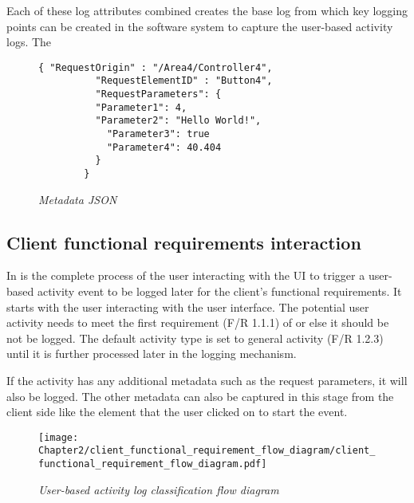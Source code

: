 \clearpage
Each of these log attributes combined creates the base log from which key logging points can be created in the software system to capture the user-based activity logs. The 

\begin{figure}[!htb]
	\centering
	\begin{lstlisting}[style=json] 
		{ "RequestOrigin" : "/Area4/Controller4",
		  "RequestElementID" : "Button4",
		  "RequestParameters": {
		  "Parameter1": 4,
		  "Parameter2": "Hello World!",
			"Parameter3": true
			"Parameter4": 40.404
		  }		
		}
	\end{lstlisting}
	\caption[Metadata JSON]
	{\textit{Metadata JSON}}\label{fig:Ch2_Metadata_Json_Example}
\end{figure}

\clearpage

\subsection{Client functional requirements interaction}
\par In  is the complete process of the user interacting with the UI to trigger a user-based activity event to be logged later for the client's functional requirements. It starts with the user interacting with the user interface. The potential user activity needs to meet the first requirement (F/R 1.1.1) of  or else it should be not be logged. The default activity type is set to general activity (F/R 1.2.3) until it is further processed later in the logging mechanism.\par If the activity has any additional metadata such as the request parameters, it will also be logged. The other metadata can also be captured in this stage from the client side like the element that the user clicked on to start the event.

\begin{figure}[!htb] %
	\centering %
	\texttt{[image: Chapter2/client\_functional\_requirement\_flow\_diagram/client\_functional\_requirement\_flow\_diagram.pdf]}
	\caption[User-based activity log classification flow diagram]
	{\textit{User-based activity log classification flow diagram}}\label{fig:ch2_user_based_actvity_classification}
\end{figure}

\clearpage

